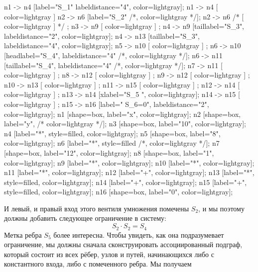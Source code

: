 \begin{example}
\begin{center}
{	n1 -> n4 [label="S_1" labeldistance="4", color=lightgray];
        n1 -> n4 [ color=lightgray ]
	n2 -> n6 [label="S_2" /*, color=lightgray */];
	n2 -> n6 /* [ color=lightgray ] */ ;
	n3 -> n9 [ color=lightgray ] ;
	n4 -> n9 [taillabel="S_3", labeldistance="2", color=lightgray];
	n4 -> n13 [taillabel="S_3", labeldistance="4", color=lightgray];
	n5 -> n10 [ color=lightgray ] ;
	n6 -> n10 [headlabel="S_4", labeldistance="4" /*, color=lightgray */];
	n6 -> n11 [taillabel="S_4", labeldistance="4" /*, color=lightgray */];
	n7 -> n11 [ color=lightgray ] ;
	n8 -> n12 [ color=lightgray ] ;
	n9 -> n12 [ color=lightgray ] ;
	n10 -> n13 [ color=lightgray ] ; 
	n11 -> n15 [ color=lightgray ] ;
	n12 -> n14 [ color=lightgray ] ;	
	n13 -> n14 [xlabel="S_5  ", color=lightgray];
	n14 -> n15 [ color=lightgray ] ;
	n15 -> n16 [label="  S_6=0", labeldistance="2", color=lightgray];
	n1 [shape=box, label="x", color=lightgray];
	n2 [shape=box, label="y", /* color=lightgray */];
	n3 [shape=box, label="10", color=lightgray];
	n4 [label="*", style=filled, color=lightgray];
	n5 [shape=box, label="8", color=lightgray];
	n6 [label="*", style=filled /*, color=lightgray */];
	n7 [shape=box, label="12", color=lightgray];
	n8 [shape=box, label="1", color=lightgray];
	n9 [label="*", color=lightgray];
	n10 [label="*", color=lightgray];
	n11 [label="*", color=lightgray];	
	n12 [label="+", color=lightgray];	
	n13 [label="*", style=filled, color=lightgray];
	n14 [label="+", color=lightgray];
	n15 [label="+", style=filled, color=lightgray];
	n16 [shape=box, label="0", color=lightgray];		
}
\end{center}
И левый, и правый вход этого вентиля умножения помечены $S_2$, и мы поэтому должны добавить следующее ограничение в систему:
$$
S_2 \cdot S_2 = S_4
$$
Метка ребра $S_5$ более интересна. Чтобы увидеть, как она подразумевает ограничение, мы должны сначала сконструировать ассоциированный подграф, который состоит из всех рёбер, узлов и путей, начинающихся либо с константного входа, либо с помеченного ребра. Мы получаем
\begin{center}
\end{center}
\end{example}
